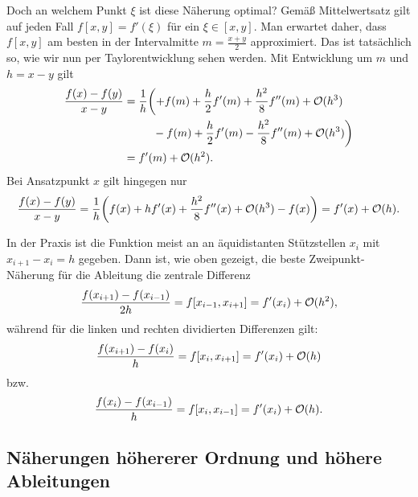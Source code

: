 Doch an welchem Punkt $\xi$ ist diese Näherung optimal? Gemäß
Mittelwertsatz gilt auf jeden Fall $f[x,y]=f'(\xi)$ für ein $\xi\in
[x,y]$. Man erwartet daher, dass $f[x,y]$ am besten in der
Intervalmitte $m=\frac{x+y}{2}$ approximiert. Das ist tatsächlich so,
wie wir nun per Taylorentwicklung sehen werden. Mit Entwicklung um $m$
und $h=x-y$ gilt
\begin{align}
  \frac{f(x) - f(y)}{x-y} &= \frac{1}{h}
  \biggl(+f(m) + \frac{h}{2}f'(m) + \frac{h^2}{8}f''(m) + \O(h^3)\nonumber\\
  &\phantom{= \frac{1}{h}\biggl(}-f(m) + \frac{h}{2}f'(m) - \frac{h^2}{8}f''(m) + \O(h^3)
  \biggr)\nonumber\\
  &=  f'(m) + \O(h^2).
\end{align}
Bei Ansatzpunkt $x$ gilt hingegen nur
\begin{align}
  \frac{f(x) - f(y)}{x-y} = \frac{1}{h}
  \biggl(f(x) + h f'(x) + \frac{h^2}{8}f''(x) + \mathcal O(h^3) - f(x) \biggr)
  =  f'(x) + \mathcal O(h).
\end{align}

In der Praxis ist die Funktion meist an an äquidistanten Stützstellen
$x_i$ mit $x_{i+1}-x_i=h$ gegeben. Dann ist, wie oben gezeigt, die
beste Zweipunkt-Näherung für die Ableitung die zentrale Differenz
\begin{equation}
  \label{eq:2orderdiff}
  \frac{f(x_{i+1}) - f(x_{i-1})}{2h} = f[x_{i-1},x_{i+1}] = f'(x_i) + \mathcal O(h^2),
\end{equation}
während für die linken und rechten dividierten Differenzen gilt:
\begin{equation}
  \frac{f(x_{i+1}) - f(x_{i})}{h} = f[x_{i},x_{i+1}] = f'(x_i) + \mathcal O(h)
\end{equation}
bzw.
\begin{equation}
  \frac{f(x_{i}) - f(x_{i-1})}{h} = f[x_{i},x_{i-1}] = f'(x_i) + \mathcal O(h).
\end{equation}

\subsection{Näherungen höhererer Ordnung und höhere Ableitungen}

